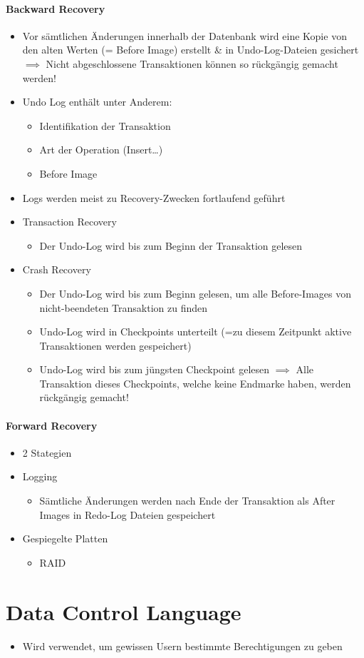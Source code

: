 \paragraph{Backward Recovery}
\begin{itemize}
    \item Vor sämtlichen Änderungen innerhalb der Datenbank wird eine Kopie von den alten Werten (= Before Image) erstellt \& in Undo-Log-Dateien gesichert $\implies$ Nicht abgeschlossene Transaktionen können so rückgängig gemacht werden!
    \item Undo Log enthält unter Anderem:
    \begin{itemize}
        \item Identifikation der Transaktion
        \item Art der Operation (Insert\dots)
        \item Before Image
    \end{itemize}
    \item Logs werden meist zu Recovery-Zwecken fortlaufend geführt
    \item Transaction Recovery
    \begin{itemize}
        \item Der Undo-Log wird bis zum Beginn der Transaktion gelesen
    \end{itemize}
    \item Crash Recovery
    \begin{itemize}
        \item Der Undo-Log wird bis zum Beginn gelesen, um alle Before-Images von nicht-beendeten Transaktion zu finden
        \item Undo-Log wird in Checkpoints unterteilt (=zu diesem Zeitpunkt aktive Transaktionen werden gespeichert)
        \item Undo-Log wird bis zum jüngsten Checkpoint gelesen $\implies$ Alle Transaktion dieses Checkpoints, welche keine Endmarke haben, werden rückgängig gemacht!
    \end{itemize}
\end{itemize}

\paragraph{Forward Recovery}
\begin{itemize}
    \item 2 Stategien
    \item Logging
    \begin{itemize}
        \item Sämtliche Änderungen werden nach Ende der Transaktion als After Images in Redo-Log Dateien gespeichert
    \end{itemize}
    \item Gespiegelte Platten
    \begin{itemize}
        \item RAID
    \end{itemize}
\end{itemize}

\section{Data Control Language}
\begin{itemize}
    \item Wird verwendet, um gewissen Usern bestimmte Berechtigungen zu geben
\end{itemize}